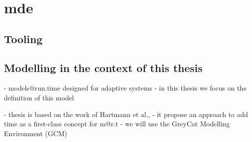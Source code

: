 \section{\glsdesc{mde}}



\subsection{Tooling}

\subsection{Modelling in the context of this thesis}

- models@run.time designed for adaptive systems
- in this thesis we focus on the definition of this model

- thesis is based on the work of Hartmann et al.,
- it propose an approach to add time as a first-class concept for m@r.t
- we will use the GreyCat Modelling Environment (GCM)

